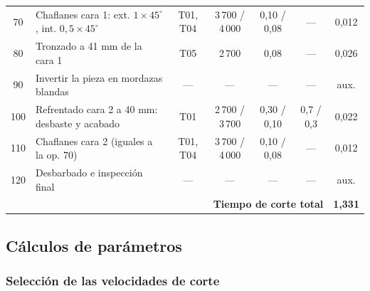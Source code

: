 \documentclass[12pt,a4paper]{article}
\begin{document}
{\begin{longtable}{c >{\raggedright\arraybackslash}p{3.8cm} c c c c c}
			70                                                 & Chaflanes cara 1: ext. $1\times45^\circ$, int. $0{,}5\times45^\circ$    & T01, T04          & 3\,700 / 4\,000   & 0,10 / 0,08 & ---              & 0,012 \\
			80                                                 & Tronzado a 41 mm de
			la cara 1                                          & T05                                                                     & 2\,700
			                                                   & 0,08                                                                    & ---               & 0,026                                                      \\
			90                                                 & Invertir la pieza en mordazas blandas                                   & ---               & ---               & ---         & ---              & aux.  \\
			100                                                & Refrentado cara 2 a 40 mm: desbaste y acabado                           & T01               & 2\,700 / 3\,700   & 0,30 / 0,10 & 0,7 / 0,3        & 0,022 \\
			110                                                & Chaflanes cara 2 (iguales a la op. 70)                                  & T01, T04
			                                                   & 3\,700 / 4\,000                                                         & 0,10 / 0,08       & ---               & 0,012                                  \\
			120                                                & Desbarbado e inspección final                                           & ---               & ---               & ---         & ---              & aux.  \\
			\hline
			\multicolumn{6}{r}{\textbf{Tiempo de corte total}} & \textbf{1,331}
			\\
		\end{longtable}}

\subsection{Cálculos de parámetros}\label{sec:calculos}

\subsubsection{Selección de las velocidades de corte}
\end{document}
